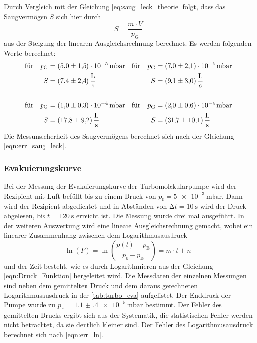     \noindent Durch Vergleich mit der Gleichung \eqref{eq:saug_leck_theorie} folgt, dass das Saugvermögen $S$ sich hier durch
    \begin{equation*}
      S = \frac{m \cdot V}{p_\text{G}}
    \end{equation*}
    aus der Steigung der linearen Ausgleichsrechnung berechnet. Es werden folgenden Werte berechnet:
    \begin{align*}
      \text{für} \quad p_\text{G} &= \SI{5.0(15)e-5}{\milli\bar}   & \text{für} \quad p_\text{G} &= \SI{7.0(21)e-5}{\milli\bar} \\
      S &= \SI{7.4 \pm 2.4}{\litre\per\second}                 & S &= \SI{9.1 \pm 3.0}{\litre\per\second}  \\
      \\
      \text{für} \quad p_\text{G} &= \SI{1.0(3)e-4}{\milli\bar}  & \text{für} \quad p_\text{G} &= \SI{2.0(6)e-4}{\milli\bar} \\
      S &= \SI{17.8 \pm 9.2}{\litre\per\second}                & S &= \SI{31.7 \pm 10.1}{\litre\per\second}  
    \end{align*}
    Die Messunsicherheit des Saugvermögens berechnet sich nach der Gleichung \eqref{eqn:err_saug_leck}.

  \subsubsection{Evakuierungskurve}

    \noindent Bei der Messung der Evakuierungskurve der Turbomolekularpumpe wird der Rezipient mit Luft befüllt bis zu einem Druck von $p_0 = \SI{5e-3}{\milli\bar}$. Dann wird der Rezipient 
    abgedichtet und in Abständen von $\increment t = \SI{10}{\second}$ wird der Druck abgelesen, bis $ t = \SI{120}{\second}$ erreicht ist. Die Messung wurde drei mal ausgeführt.
    In der weiteren Auswertung wird eine lineare Ausgleichsrechnung gemacht, wobei ein linearer Zusammenhang zwischen dem Logarithmusausdruck 
    \begin{equation*}
      \ln(F) = \ln \left( \frac{p(t) - p_\text{E}}{p_0 - p_\text{E}}\right) = m \cdot t + n \, 
    \end{equation*} 
    und der Zeit besteht, wie es durch Logarithmieren aus der Gleichung \eqref{eqn:Druck_Funktion} hergeleitet wird. Die Messdaten der einzelnen Messungen sind neben dem gemittelten Druck und dem daraus gerechneten Logarithmusausdruck in der \autoref{tab:turbo_eva} aufgelistet. 
    Der Enddruck der Pumpe wurde zu $p_\text{E} = \SI{1.1(4)e-5}{\milli\bar}$ bestimmt. Der Fehler des gemittelten Drucks ergibt sich aus der Systematik, die statistischen Fehler werden nicht betrachtet, da sie deutlich kleiner sind.
    Der Fehler des Logarithmusausdruck berechnet sich nach \eqref{eqn:err_ln}. 
  


